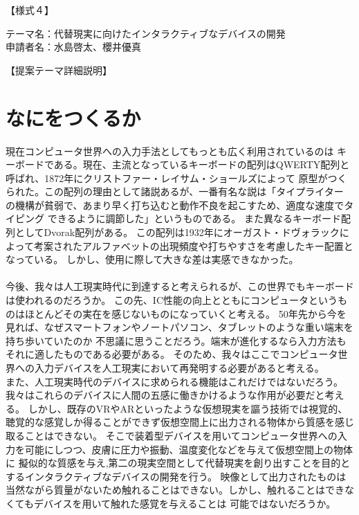 \documentclass[11pt,onecolumn]{jsarticle}
\begin{document}
\begin{flushright}
【様式４】
\end{flushright}

\begin{flushleft}
テーマ名：代替現実に向けたインタラクティブなデバイスの開発\\
申請者名：水島啓太、櫻井優真
\end{flushleft}
\begin{center}
【提案テーマ詳細説明】
\end{center}

\section{なにをつくるか}
現在コンピュータ世界への入力手法としてもっとも広く利用されているのは
キーボードである。現在、主流となっているキーボードの配列はQWERTY配列と呼ばれ、1872年にクリストファー・レイサム・ショールズによって
原型がつくられた。この配列の理由として諸説あるが、一番有名な説は「タイプライター
の機構が貧弱で、あまり早く打ち込むと動作不良を起こすため、適度な速度でタイピング
できるように調節した」というものである。
また異なるキーボード配列としてDvorak配列がある。
この配列は1932年にオーガスト・ドヴォラックによって考案されたアルファベットの出現頻度や打ちやすさを考慮したキー配置となっている。
しかし、使用に際して大きな差は実感できなかった。\\
\\

今後、我々は人工現実時代に到達すると考えられるが、この世界でもキーボードは使われるのだろうか。
この先、IC性能の向上とともにコンピュータというものはほとんどその実在を感じないものになっていくと考える。
50年先から今を見れば、なぜスマートフォンやノートパソコン、タブレットのような重い端末を持ち歩いていたのか
不思議に思うことだろう。端末が進化するなら入力方法もそれに適したものである必要がある。
そのため、我々はここでコンピュータ世界への入力デバイスを人工現実において再発明する必要があると考える。
\\
また、人工現実時代のデバイスに求められる機能はこれだけではないだろう。
我々はこれらのデバイスに人間の五感に働きかけるような作用が必要だと考える。
しかし、既存のVRやARといったような仮想現実を謳う技術では視覚的、聴覚的な感覚しか得ることができず仮想空間上に出力される物体から質感を感じ取ることはできない。
そこで装着型デバイスを用いてコンピュータ世界への入力を可能にしつつ、皮膚に圧力や振動、温度変化などを与えて仮想空間上の物体に
擬似的な質感を与え,第二の現実空間として代替現実を創り出すことを目的とするインタラクティブなデバイスの開発を行う。
映像として出力されたものは当然ながら質量がないため触れることはできない。しかし、触れることはできなくてもデバイスを用いて触れた感覚を与えることは
可能ではないだろうか。
\end{document}
